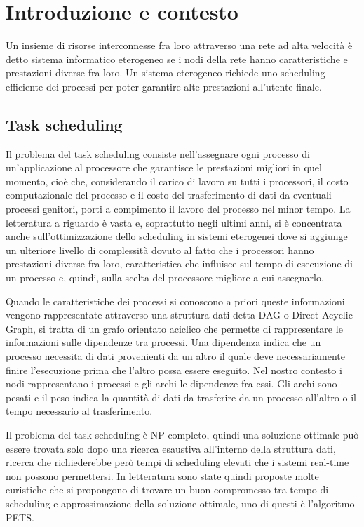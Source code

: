 \chapter{Introduzione e contesto}
\vspace{4cm}
Un insieme di risorse interconnesse fra loro attraverso una rete ad alta velocità è detto sistema informatico eterogeneo se i nodi della rete hanno caratteristiche e prestazioni diverse fra loro.
Un sistema eterogeneo richiede uno scheduling efficiente dei processi per poter garantire alte prestazioni all'utente finale.

\section{Task scheduling}
Il problema del task scheduling consiste nell'assegnare ogni processo di un'applicazione al processore che garantisce le prestazioni migliori in quel momento, cioè che, considerando il carico di lavoro su tutti i processori, il costo computazionale del processo e il costo del trasferimento di dati da eventuali processi genitori, porti a compimento il lavoro del processo nel minor tempo.
La letteratura a riguardo è vasta e, soprattutto negli ultimi anni, si è concentrata anche sull'ottimizzazione dello scheduling in sistemi eterogenei dove si aggiunge un ulteriore livello di complessità dovuto al fatto che i processori hanno prestazioni diverse fra loro, caratteristica che influisce sul tempo di esecuzione di un processo e, quindi, sulla scelta del processore migliore a cui assegnarlo.

Quando le caratteristiche dei processi si conoscono a priori queste informazioni vengono rappresentate attraverso una struttura dati detta DAG o Direct Acyclic Graph, si tratta di un grafo orientato aciclico che permette di rappresentare le informazioni sulle dipendenze tra processi. Una dipendenza indica che un processo necessita di dati provenienti da un altro il quale deve necessariamente finire l'esecuzione prima che l'altro possa essere eseguito.
Nel nostro contesto i nodi rappresentano i processi e gli archi le dipendenze fra essi. Gli archi sono pesati e il peso indica la quantità di dati da trasferire da un processo all'altro o il tempo necessario al trasferimento.

Il problema del task scheduling è NP-completo\cite{ULLMAN1975384}, quindi una soluzione ottimale può essere trovata solo dopo una ricerca esaustiva all'interno della struttura dati, ricerca che richiederebbe però tempi di scheduling elevati che i sistemi real-time non possono permettersi. 
In letteratura sono state quindi proposte molte euristiche che si propongono di trovare un buon compromesso tra tempo di scheduling e approssimazione della soluzione ottimale, uno di questi è l'algoritmo PETS\cite{ilavarasan2007low}.


